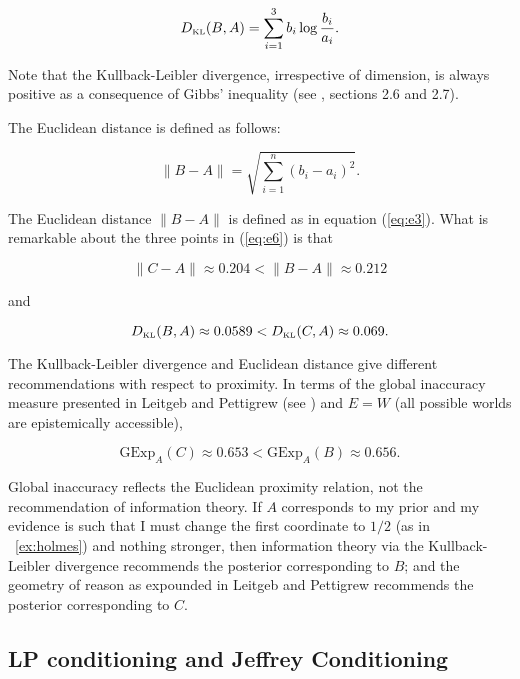 \documentclass[smallextended]{svjour3}       %
\begin{document}
\begin{equation}
  \label{eq:e7}
  D_{\mbox{\tiny KL}}(B,A)=\sum_{i=1}^{3}b_{i}\log\frac{b_{i}}{a_{i}}.
\end{equation}

Note that the Kullback-Leibler divergence, irrespective of dimension,
is always positive as a consequence of Gibbs' inequality (see
, sections 2.6 and 2.7).

The Euclidean distance is defined as follows:

\begin{equation}
  \label{eq:e3}
  \|B-A\|=\sqrt{\sum_{i=1}^{n}\left(b_{i}-a_{i}\right)^{2}}.
\end{equation}

The Euclidean distance $\|B-A\|$ is defined as in equation
(\ref{eq:e3}). What is remarkable about the three points in
(\ref{eq:e6}) is that

\begin{equation}
  \label{eq:e8}
  \|C-A\|\approx{}0.204<\|B-A\|\approx{}0.212
\end{equation}

and

\begin{equation}
  \label{eq:e9}
  D_{\mbox{\tiny KL}}(B,A)\approx{}0.0589<D_{\mbox{\tiny KL}}(C,A)\approx{}0.069.
\end{equation}

The Kullback-Leibler divergence and Euclidean distance give different
re\-commendations with respect to proximity. In terms of the global
inaccuracy measure presented in Leitgeb and Pettigrew (see
) and $E=W$ (all possible worlds
are epistemically accessible),

\begin{equation}
  \label{eq:e8a}
  \mbox{GExp}_{A}(C)\approx{}0.653<\mbox{GExp}_{A}(B)\approx{}0.656.
\end{equation}

Global inaccuracy reflects the Euclidean proximity relation, not the
re\-commendation of information theory. If $A$ corresponds to my prior
and my evidence is such that I must change the first coordinate to
$1/2$ (as in {\xample}~\ref{ex:holmes}) and nothing stronger, then
information theory via the Kullback-Leibler divergence re\-commends
the posterior corresponding to $B$; and the geometry of reason as
expounded in Leitgeb and Pettigrew recommends the posterior
corresponding to $C$. 

\subsection{LP conditioning and Jeffrey Conditioning}
\label{subsec:meexughi}
\end{document}
